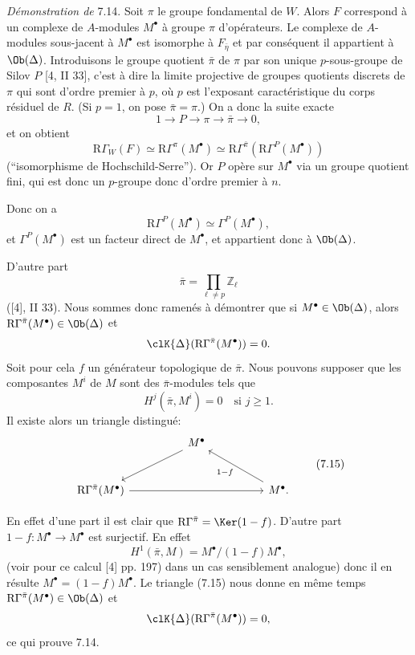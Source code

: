 \emph{Démonstration de} 7.14. Soit $\pi$ le groupe fondamental de $W$. Alors $F$ correspond à un complexe de $A$-modules $M^\bullet$ à groupe $\pi$ d'opérateurs. Le complexe de $A$-modules sous-jacent à $M^\bullet$ est isomorphe à $F_{\bar\eta}$ et par conséquent il appartient à $\Ob(\Delta)$. Introduisons le groupe quotient $\bar\pi$ de $\pi$ par son unique $p$-sous-groupe de Silov $P$ [4, II 33], c'est à dire la limite projective de groupes quotients discrets de $\pi$ qui sont d'ordre premier à $p$, où $p$ est l'exposant caractéristique du corps résiduel de $R$. (Si $p=1$, on pose $\bar\pi=\pi$.) On a donc la suite exacte
\[
1\longrightarrow P\longrightarrow \pi\longrightarrow \bar\pi\longrightarrow0,
\]
et on obtient
\[
\mathrm{R}\Gamma_W(F)\simeq \mathrm{R}\Gamma^\pi(M^\bullet)
\simeq \mathrm{R}\Gamma^{\bar\pi}(\mathrm{R}\Gamma^P(M^\bullet))
\]
(``isomorphisme de Hochschild-Serre''). Or $P$ opère sur $M^\bullet$ via un groupe quotient fini, qui est donc un $p$-groupe donc d'ordre premier à $n$.

Donc on a
\[
\mathrm{R}\Gamma^P(M^\bullet)\simeq \Gamma^P(M^\bullet),
\]
et $\Gamma^P(M^\bullet)$ est un facteur direct de $M^\bullet$, et appartient donc à $\Ob(\Delta)$.

D'autre part
\[
\bar\pi=\prod_{\ell\ne p}\mathbb{Z}_\ell
\]
([4], II 33). Nous sommes donc ramenés à démontrer que si $M^\bullet\in\Ob(\Delta)$, alors $\mathrm{R}\Gamma^{\bar\pi}(M^\bullet)\in\Ob(\Delta)$ et
\[
\clK{\Delta}(\mathrm{R}\Gamma^{\bar\pi}(M^\bullet))=0.
\]
Soit pour cela $f$ un générateur topologique de $\bar\pi$. Nous pouvons supposer que les composantes $M^i$ de $M$ sont des $\bar\pi$-modules tels que
\[
H^j(\bar\pi,M^i)=0\quad\text{si }j\ge1.
\]
Il existe alors un triangle distingué:
\[
\begin{tikzcd}[column sep=huge,row sep=large]
& M^\bullet \arrow[dl] &\\
\mathrm{R}\Gamma^{\bar\pi}(M^\bullet) \arrow[rr] && M^\bullet \arrow[ul,"1-f"].
\end{tikzcd}
\tag{7.15}
\]

En effet d'une part il est clair que $\mathrm{R}\Gamma^{\bar\pi}=\Ker(1-f)$. D'autre part $1-f:M^\bullet\to M^\bullet$ est surjectif. En effet
\[
H^1(\bar\pi,M)=M^\bullet/(1-f)M^\bullet,
\]
(voir pour ce calcul [4] pp. 197) dans un cas sensiblement analogue) donc il en résulte $M^\bullet=(1-f)M^\bullet$. Le triangle (7.15) nous donne en même temps $\mathrm{R}\Gamma^{\bar\pi}(M^\bullet)\in\Ob(\Delta)$ et
\[
\clK{\Delta}(\mathrm{R}\Gamma^{\bar\pi}(M^\bullet))=0,
\]
ce qui prouve 7.14.

